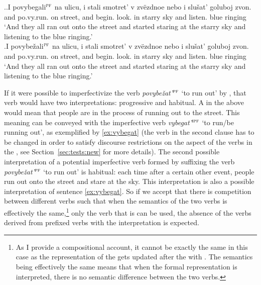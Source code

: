 \ex.\label{ex:povy}\ag.\label{ex:povybegat}I povybegali$^{\textsc{pf}}$ na ulicu, i stali smotret' v zv\"{e}zdnoe nebo i slu\v{s}at' goluboj zvon.\\
and po.vy.run. on street, and begin. look. in starry sky and listen. blue ringing\\
\trans `And they all ran out onto the street and started staring at the starry sky and listening to the blue ringing.'\\
\bg.\label{ex:povybezhat}I povybe\v{z}ali$^{\textsc{pf}}$ na ulicu, i stali smotret' v zv\"{e}zdnoe nebo i slu\v{s}at' goluboj zvon.\\
and po.vy.run. on street, and begin. look. in starry sky and listen. blue ringing\\
\trans `And they all ran out onto the street and started staring at the starry sky and listening to the blue ringing.'

If it were possible to imperfectivize the verb \textit{povybe\v{z}at'}$^{\textsc{pf}}$ `to run out'  by , that  verb would have two interpretations: progressive and habitual. A  in the above  would mean that people are in the process of running out to the street. This meaning can be conveyed with the imperfective verb \textit{vybegat'}$^{\textsc{ipf}}$ `to run/be running out', as exemplified by \ref{ex:vybegat} (the verb in the second clause has to be changed in order to satisfy discourse restrictions on the aspect of the verbs in the , see Section~\ref{sec:tests:new} for more details). The second possible interpretation of a potential imperfective verb formed by suffixing the verb \textit{povybe\v{z}at'}$^{\textsc{pf}}$ `to run out' is habitual: each time after a certain other event, people run out onto the street and stare at the sky. This interpretation is also a possible interpretation of sentence \ref{ex:vybegat}. So if we accept that there is competition between different verbs such that when the semantics of the two verbs is effectively the same,\footnote{As I provide a compositional account, it cannot be exactly the same in this case as the representation of the  gets updated after the  with . The semantics being effectively the same means that when the formal representation is interpreted, there is no semantic difference between the two verbs.} only the verb that is  can be used, the absence of the  verbs derived from prefixed verbs with the  interpretation is expected.

